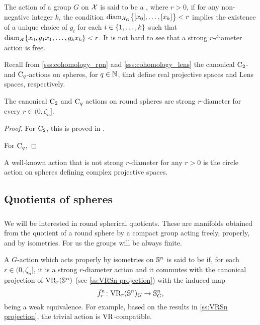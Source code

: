 \subsubsection{}\label{sss:strong_r_action}

The action of a group $G$ on $\cX$ is said to be a , where $r > 0$, if for any non-negative integer $k$, the condition $\diam_{\cX_G}\set[\big]{[x_0],\dots,[x_k]} < r$ implies the existence of a unique choice of $g_i$ for each $i \in \set{1,\dots,k}$ such that $\diam_{\cX}\set{x_0, g_1x_1, \dots, g_kx_k} < r$.
It is not hard to see that a strong $r$-diameter action is free.

Recall from \cref{sss:cohomology_rpn} and \cref{sss:cohomology_lens} the canonical $\rC_2$- and $\rC_q$-actions on spheres, for $q \in \N$, that define real projective spaces and Lens spaces, respectively.

\medskip\lemma
The canonical $\rC_2$ and $\rC_q$ actions on round spheres are strong $r$-diameter for every $r \in (0, \zeta_n]$.

\begin{proof}
    For $\rC_2$, this is proved in \cite[Cor.~4.3]{adams2022metric}.

    For $\rC_q$, 
\end{proof}

A well-known action that is not strong \(r\)-diameter for any \(r>0\) is the circle action on spheres defining complex projective spaces.

\subsection{Quotients of spheres}

\subsubsection{}\label{ss:VR-compatible-Sn}

We will be interested in round spherical quotients.
These are manifolds obtained from the quotient of a round sphere by a compact group acting freely, properly, and by isometries.
For us the groups will be always finite.

A \(G\)-action which acts properly by isometries on \(\bS^n\)  is said to be  if, for each $r \in (0, \zeta_n]$, it is a strong $r$-diameter action and it commutes with the canonical projection of \(\VR_r(\bS^n)\) (see \cref{ss:VRSn projection}) with the induced map
\[
\tilde f_r^n \colon \VR_r(\bS^n)_G \to \bS^n_G,
\]
being a weak equivalence.
For example, based on the results in \cref{ss:VRSn projection}, the trivial action is \(\VR\)-compatible.

